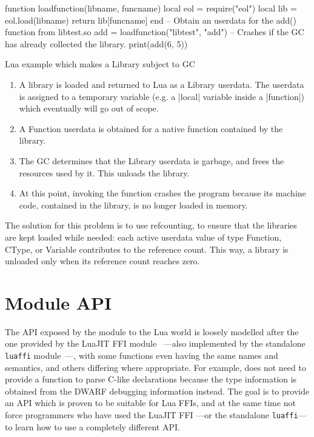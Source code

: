 \begin{listing}[ht]
	\begin{luacode}
		function loadfunction(libname, funcname)
		  local eol = require("eol")
		  local lib = eol.load(libname)
		  return lib[funcname]
		end
		-- Obtain an userdata for the add() function from libtest.so
		add = loadfunction("libtest", "add")
		-- Crashes if the GC has already collected the library.
		print(add(6, 5))
	\end{luacode}
	\caption{Lua example which makes a \textsf{Library} subject to GC}
	\label{lst:library-gc-issue}
\end{listing}

\begin{enumerate}

	\item A library is loaded and returned to Lua as a \textsf{Library}
		userdata. The userdata is assigned to a temporary variable (e.g.
		a \Mlua|local| variable inside a \Mlua|function|) which eventually
		will go out of scope.
	\item A \textsf{Function} userdata is obtained for a native function
		contained by the library.
	\item The GC determines that the \textsf{Library} userdata is garbage,
		and frees the resources used by it. This unloads the library.
	\item At this point, invoking the function crashes the program because
		its machine code, contained in the library, is no longer loaded in
		memory.

\end{enumerate}

The solution for this problem is to use \gls{refcounting}, to ensure that the
libraries are kept loaded while needed: each active userdata value of type
\textsf{Function}, \textsf{CType}, or \textsf{Variable} contributes to the
reference count. This way, a library is unloaded only when its reference count
reaches zero.


\section{Module API}
	\label{sec:design-lua-api}

The \gls{API} exposed by the \Eol* module to the Lua world is loosely modelled
after the one provided by the LuaJIT FFI module~\cite{lj-ffi-api} —also
implemented by the standalone \verb|luaffi| module~\cite{luaffi}—, with some
functions even having the same names and semantics, and others differing where
appropriate. For example, \Eol* does not need to provide a function to parse
C-like declarations because the type information is obtained from the
\gls{DWARF} debugging information instead. The goal is to provide an API which
is proven to be suitable for Lua FFIs, and at the same time not force
programmers who have used the LuaJIT FFI —or the standalone \verb|luaffi|— to
learn how to use a completely different API.

